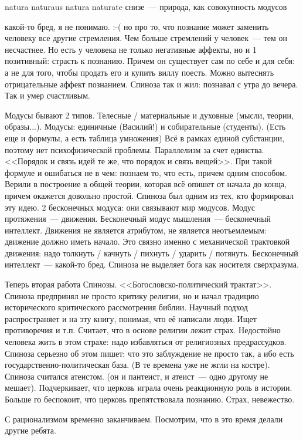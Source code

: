 natura naturaus
natura naturate снизе~--- природа, как совокупность модусов

какой-то бред, я не понимаю. :-( но про то, что познание может заменить человеку все другие стремления.
Чем больше стремлений у человек~--- тем он несчастнее. Но есть у человека не только негативные аффекты, но и 1 позитивный: страсть к познанию. Причем он существует сам по себе и для себя: а не для того, чтобы продать его и купить виллу поесть. Можно вытеснять отрицательные аффект познанием. Спиноза так и жил: познавал с утра до вечера. Так и умер счастливым.

Модусы бывают 2 типов. Телесные / материальные и духовные (мысли, теории, образы...). Модусы: единичные (Василий!) и собирательные (студенты). (Есть еще и формулы, а есть таблица умножения) 
Всё в рамках единой субстанции, поэтому нет психофизической проблемы. Параллелизм за счет единства. <<Порядок и связь идей те же, что порядок и связь вещей>>. При такой формуле и ошибаться не в чем: познаем то, что есть, причем одним способом. Верили в построение в общей теории, которая всё опишет от начала до конца, причем окажется довольно простой. Спиноза был одним из тех, кто формировал эту идею.
2 бесконечных модуса: они связывают мир модусов. Модус протяжения~--- движения. Бесконечный модус мышления~--- бесконечный интеллект. Движения не является атрибутом, не является неотъемлемым: движение должно иметь начало. Это связно именно с механической трактовкой движения: надо толкнуть / качнуть / пихнуть / ударить / потянуть.
Бесконечный интеллект~--- какой-то бред. Спиноза не выделяет бога как носителя сверхразума.

Теперь вторая работа Спинозы. <<Богословско-политический трактат>>. Спиноза предпринял не просто критику религии, но и начал традицию исторического критического рассмотрения библии. Научный подход распространяет и на эту книгу, понимая, что её написали люди. Ищет противоречия и т.п. Считает, что в основе религии лежит страх. Недостойно человека жить в этом страхе: надо избавляться от религиозных предрассудков. Спиноза серьезно об этом пишет: что это заблуждение не просто так, а ибо есть государственно-политическая база. (В те времена уже не жгли на костре). Спиноза считался атеистом. (он и пантеист, и атеист~--- одно другому не мешает). Подчеркивает, что церковь играла очень реакционную роль в истории. Больше го беспокоит, что церковь препятствовала познанию. Страх, невежество.

С рационализмом временно заканчиваем. Посмотрим, что в это время делали другие ребята.